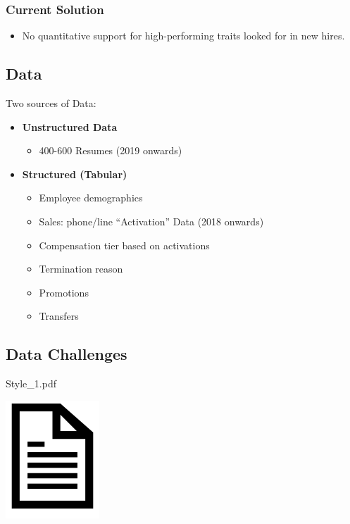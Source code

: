 \documentclass[
]{article}
\providecommand{\tightlist}{%
  \setlength{\itemsep}{0pt}\setlength{\parskip}{0pt}}
\begin{document}
\hypertarget{current-solution}{%
\subsubsection{\texorpdfstring{\textbf{Current
Solution}}{Current Solution}}\label{current-solution}}

\begin{itemize}
\tightlist
\item
  No quantitative support for high-performing traits looked for in new
  hires.
\end{itemize}

\hypertarget{data}{%
\subsection{Data}\label{data}}

Two sources of Data:

\begin{itemize}
\tightlist
\item
  \textbf{Unstructured Data}

  \begin{itemize}
  \tightlist
  \item
    400-600 Resumes (2019 onwards)
  \end{itemize}
\item
  \textbf{Structured (Tabular)}

  \begin{itemize}
  \tightlist
  \item
    Employee demographics
  \item
    Sales: phone/line ``Activation'' Data (2018 onwards)
  \item
    Compensation tier based on activations
  \item
    Termination reason
  \item
    Promotions
  \item
    Transfers
  \end{itemize}
\end{itemize}

\hypertarget{data-challenges}{%
\subsection{Data Challenges}\label{data-challenges}}

Style\_1.pdf

\includegraphics{../img/project_proposal/09_resume1.png}
\end{document}
